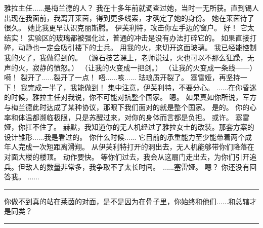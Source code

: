 \documentclass[openany]{book}
\begin{document}
\begin{dialogue}
     雅拉主任......是梅兰德的人？
     我在十多年前就调查过她，当时一无所获。直到锡人出现在我面前，我离开莱茵，得到更多线索，才确定了她的身份。
     她在莱茵待了很久。
     她比我更早认识克丽斯腾。
     伊芙利特，攻击你左手边的窗户。
     好！
     它太结实！
     实验区的玻璃都被强化过，普通的冲击是没有办法打碎它的。
     如果直接打碎，动静也一定会吸引楼下的士兵。
     用我的火，来切开这面玻璃。
     我已经能控制我的火了，我做得到的。
     （源石技艺课上，老师说过，火也可以不那么狂躁，无声的火，寂静的愤怒。）
     （让我的火变成一把剑。）
     （让我的火变成一条线——）
     嗬！
     裂开了......裂开了一点！
     唔......咳......
     珐琅质开裂了。
     塞雷娅，再坚持一下！
     我完成一半了，我能做到！
     集中注意，伊芙利特，不要分心。
     ......在你昏迷的时候，雅拉主任对我说，你不可能对抗整个国家。
     嗯。
     如果真如你所说，军方与梅兰德此时达成了某种协议，那眼下我们面对的就是整个国家。
     是的。
     你的心率和体温都濒临极限，只是苏醒过来，对你的身体而言都是负担。
     或许。
     塞雷娅，你扛不住了。
     赫默，我知道你的无人机经过了雅拉女士的改装。那套方案的设计雏形......我是看过的。
     你什么时候......
     它目前的承重能力至少能带着两个成年人完成一次短距离滑翔。
     从伊芙利特打开的洞出去，无人机能够带你们降落在对面大楼的楼顶。
     动作要快。
     等你们过去，我会从这扇门走出去，为你们引开追兵。但敌人的数量非常多，我争取不了太长时间。
     ......塞雷娅。
     嗯？
     你还没有回答我。
     ......
\end{dialogue}

\par\noindent\rule{\textwidth}{0.4pt}
你做不到真的站在莱茵的对面，是不是因为在骨子里，你始终和他们......和总辖才是同类？
\par\noindent\rule{\textwidth}{0.4pt}
\end{document}
